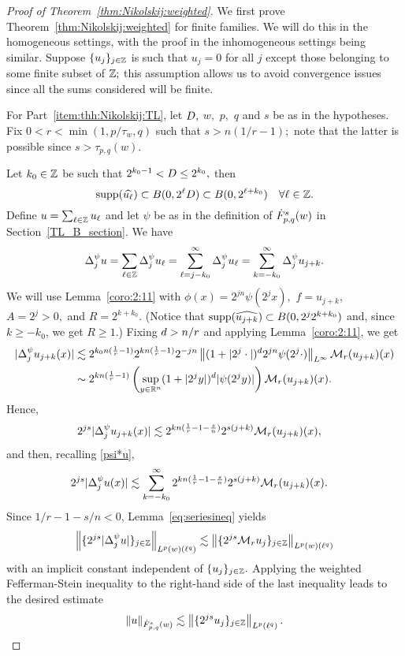 \begin{proof}[Proof of  Theorem~\ref{thm:Nikolskij:weighted}] 
We first prove Theorem~\ref{thm:Nikolskij:weighted} for finite families. We will do this in the homogeneous settings, with the proof in the inhomogeneous settings being similar. Suppose $\{u_j\}_{j\in\ent}$ is such that $u_j=0$ for all $j$ except those belonging to some finite subset of $\ent;$  this assumption allows us to avoid convergence issues since all the sums  considered will be finite.

For Part~\eqref{item:thh:Nikolskij:TL}, let $\A,$ $w,$ $p,$ $q$ and $s$ be as in the hypotheses. Fix $0<r<\min(1,p/\tau_w,q)$ such that  $s>n(1/r-1);$ note that the latter is possible since $s>\tau_{p,q}(w).$ 


Let $k_0 \in \ent$ be such that $2^{k_0 -1} < \A\leq 2^{k_0},$ then  
$$
\supp(\widehat{u_\ell}) \subset B(0, 2^\ell \A) \subset B(0, 2^{\ell +k_0}) \quad \forall \ell \in \ent.
$$
Define $u =\sum_{\ell \in \ent} u_\ell$ and let $\psi$ be as in the definition of $\tlw{p}{s}{q}{w}$ in Section~\ref{TL_B_section}. We have
\begin{equation}\label{psi*u}
\Delta^\psi_j u = \sum_{\ell \in \ent} \Delta^\psi_j u_\ell = \sum_{\ell = j - k_0}^\infty \Delta^\psi_j  u_\ell = \sum_{k = - k_0}^\infty \Delta^\psi_j u_{j+k}.
\end{equation}
We will use Lemma~\ref{coro:2:11} with $\phi(x) =  2^{jn} \psi(2^j x),$  $f = u_{j+k},$  $A= 2^{j  } >0,$ and $R= 2^{k + k_0}.$ (Notice that $\supp(\widehat{u_{j+k}}) \subset  B(0, 2^{j} 2^{k + k_0})$ and, since $k \geq -k_0$, we get $R \geq 1$.) Fixing  $\ex>n/r$ and applying Lemma~\ref{coro:2:11}, we get
\begin{align*}
|\Delta^\psi_j  u_{j+k}(x)| & \lesssim   2^{k_0n(\frac{1}{r} -1)} 2^{k n (\frac{1}{r} -1)}  2^{-jn} \norm{(1 + |2^j \cdot|)^\ex 2^{jn}\psi (2^j\cdot)}{L^\infty}  \M_r(u_{j+k})(x)\\
& \sim  2^{k n (\frac{1}{r} -1)} \left( \sup_{y \in \rn} (1 + |2^j y|)^\ex |\psi(2^j y)|\right) \M_r(u_{j+k})(x).
\end{align*}
 Hence,
\begin{align*}
2^{js}|\Delta^\psi_j  u_{j+k}(x)| & \lesssim 2^{k n (\frac{1}{r} -1-\frac{s}{n})} 2^{s(j+k)}\M_r(u_{j+k})(x),
\end{align*}
and then, recalling \eqref{psi*u}, 
\begin{align*}
2^{js} |\Delta^\psi_j  u(x)| & \lesssim  \sum_{k =  - k_0}^\infty 2^{k n (\frac{1}{r} -1-\frac{s}{n})} 2^{s(j+k)}\M_r(u_{j+k})(x).
\end{align*}
Since $1/r -1-s/n < 0$,   Lemma~\ref{eq:seriesineq}  yields
$$
\norm{\{ 2^{js} |\Delta^\psi_j  u|\}_{j\in\ent}}{L^p(w)(\ell^{q})} \lesssim \norm{\{2^{js} \M_ru_j\}_{j\in\ent}}{L^p(w)(\ell^{q})}
$$
with an implicit constant independent of $\{u_j\}_{j\in \ent}.$
Applying the weighted  Fefferman-Stein inequality  to the right-hand side of the last inequality leads to the desired estimate
\begin{equation*}
\norm{u}{\tlw{p}{s}{q}{w}} \lesssim \norm{\{2^{js}u_j\}_{j\in\ent}}{L^p(\ell^{q})}.
\end{equation*}


\end{proof}
